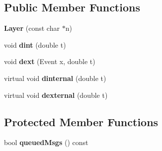 \subsection*{Public Member Functions}
\begin{DoxyCompactItemize}
\item 
{\bfseries Layer} (const char $\ast$n)\hypertarget{classLayer_a61263cb897fd7d091830e5591c9ae3b0}{}\label{classLayer_a61263cb897fd7d091830e5591c9ae3b0}

\item 
void {\bfseries dint} (double t)\hypertarget{classLayer_ac73462187fad467ee68767488f8cdf25}{}\label{classLayer_ac73462187fad467ee68767488f8cdf25}

\item 
void {\bfseries dext} (Event x, double t)\hypertarget{classLayer_a7e588f39547025f0483fc94a57fc9636}{}\label{classLayer_a7e588f39547025f0483fc94a57fc9636}

\item 
virtual void {\bfseries dinternal} (double t)\hypertarget{classLayer_a1c82b14ba3efc37969f55c633a9b3173}{}\label{classLayer_a1c82b14ba3efc37969f55c633a9b3173}

\item 
virtual void {\bfseries dexternal} (double t)\hypertarget{classLayer_ae21ef24340c6c1f6cf20d66b5ab6a5f7}{}\label{classLayer_ae21ef24340c6c1f6cf20d66b5ab6a5f7}

\end{DoxyCompactItemize}
\subsection*{Protected Member Functions}
\begin{DoxyCompactItemize}
\item 
bool {\bfseries queued\+Msgs} () const \hypertarget{classLayer_aba0f1461c09e98abc9d28ab9fc438afb}{}\label{classLayer_aba0f1461c09e98abc9d28ab9fc438afb}

\end{DoxyCompactItemize}
